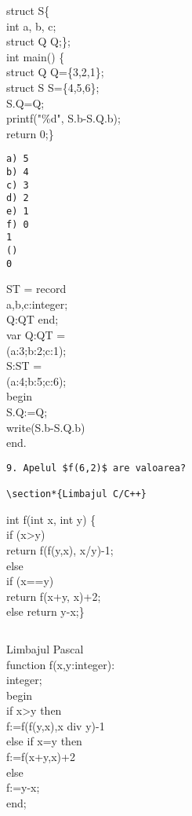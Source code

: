 \begin{verbatim}

\end{verbatim}

struct S\{\\
int a, b, c;\\
struct Q Q;\};\\
int main() \{\\
struct Q Q=\{3,2,1\};\\
struct S S=\{4,5,6\};\\
S.Q=Q;\\
printf("\%d", S.b-S.Q.b);\\
return 0;\}

\begin{verbatim}
a) 5
b) 4
c) 3
d) 2
e) 1
f) 0
1
()
0
\end{verbatim}

ST = record\\
a,b,c:integer;\\
Q:QT end;\\
var Q:QT =\\
(a:3;b:2;c:1);\\
S:ST =\\
(a:4;b:5;c:6);\\
begin\\
S.Q:=Q;\\
write(S.b-S.Q.b)\\
end.

\begin{verbatim}
9. Apelul $f(6,2)$ are valoarea?

\section*{Limbajul C/C++}
\end{verbatim}

int f(int x, int y) \{\\
if (x>y)\\
return f(f(y,x), x/y)-1;\\
else\\
if (x==y)\\
return f(x+y, x)+2;\\
else return y-x;\}

\begin{verbatim}

\end{verbatim}

Limbajul Pascal\\
function f(x,y:integer):\\
integer;\\
begin\\
if x>y then\\
f:=f(f(y,x),x div y)-1\\
else if x=y then\\
f:=f(x+y,x)+2\\
else\\
f:=y-x;\\
end;

